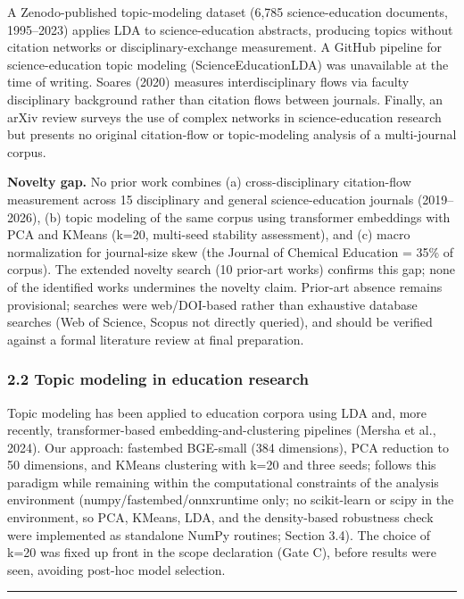 \documentclass[pdflatex,sn-apa]{sn-jnl}
\newcounter{none}
\begin{document}
A Zenodo-published topic-modeling dataset (6,785 science-education
documents, 1995--2023) applies LDA to science-education abstracts,
producing topics without citation networks or disciplinary-exchange
measurement. A GitHub pipeline for science-education topic modeling
(ScienceEducationLDA) was unavailable at the time of writing. Soares
(2020) measures interdisciplinary flows via faculty disciplinary
background rather than citation flows between journals. Finally, an
arXiv review surveys the use of complex networks in science-education
research but presents no original citation-flow or topic-modeling
analysis of a multi-journal corpus.

\textbf{Novelty gap.} No prior work combines (a) cross-disciplinary
citation-flow measurement across 15 disciplinary and general
science-education journals (2019--2026), (b) topic modeling of the same
corpus using transformer embeddings with PCA and KMeans (k=20,
multi-seed stability assessment), and (c) macro normalization for
journal-size skew (the Journal of Chemical Education = 35\% of corpus).
The extended novelty search (10 prior-art works) confirms this gap; none
of the identified works undermines the novelty claim. Prior-art absence
remains provisional; searches were web/DOI-based rather than exhaustive
database searches (Web of Science, Scopus not directly queried), and
should be verified against a formal literature review at final
preparation.

\subsubsection{2.2 Topic modeling in education
research}\label{topic-modeling-in-education-research}

Topic modeling has been applied to education corpora using LDA and, more
recently, transformer-based embedding-and-clustering pipelines (Mersha
et al., 2024). Our approach: fastembed BGE-small (384 dimensions), PCA
reduction to 50 dimensions, and KMeans clustering with k=20 and three
seeds; follows this paradigm while remaining within the computational
constraints of the analysis environment (numpy/fastembed/onnxruntime
only; no scikit-learn or scipy in the environment, so PCA, KMeans, LDA,
and the density-based robustness check were implemented as standalone
NumPy routines; Section 3.4). The choice of k=20 was fixed up front in
the scope declaration (Gate C), before results were seen, avoiding
post-hoc model selection.

\begin{center}\rule{0.5\linewidth}{0.5pt}\end{center}
\end{document}
